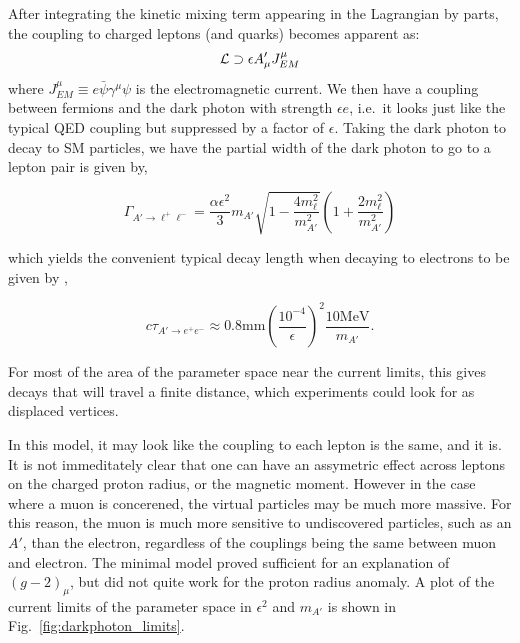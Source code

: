 After integrating the kinetic mixing term appearing in the Lagrangian by parts, the coupling to charged leptons (and quarks) becomes apparent as:
\begin{equation}
    \label{eqn:darkphoton_qed_current}
    \operatorname{\mathcal{L}} \supset \epsilon A'_\mu J^\mu_{EM}
\end{equation}
where $J^\mu_{EM} \equiv e \bar{\psi} \gamma^\mu \psi$ is the electromagnetic current.
We then have a coupling between fermions and the dark photon with strength $\epsilon e$, i.e.\ it looks just like the typical QED coupling but suppressed by a factor of $\epsilon$.
Taking the dark photon to decay to SM particles, we have the partial width of the dark photon to go to a lepton pair is given by,

\begin{equation}
    \Gamma_{A' \rightarrow \ell^+ \ell^-} = \frac{\alpha \epsilon^2}{3} m_{A'} \sqrt{1-\frac{4 m_\ell^2}{m_{A'}^2}}\left(1 + \frac{2 m_\ell^2}{m_{A'}^2}\right)
\end{equation}

\noindent which yields the convenient typical decay length when decaying to electrons to be given by \cite{Echenard:2014lma},

\begin{equation}
    c \tau_{A' \rightarrow e^+ e^-} \approx 0.8\textrm{mm} \left(\frac{10^{-4}}{\epsilon}\right)^2 \frac{10\textrm{MeV}}{m_{A'}}\textrm{.}
\end{equation}

\noindent For most of the area of the parameter space near the current limits, this gives decays that will travel a finite distance, which experiments could look for as displaced vertices.

In this model, it may look like the coupling to each lepton is the same, and it is.
It is not immeditately clear that one can have an assymetric effect across leptons on the charged proton radius, or the magnetic moment.
However in the case where a muon is concerened, the virtual particles may be much more massive.
For this reason, the muon is much more sensitive to undiscovered particles, such as an $A'$, than the electron, regardless of the couplings being the same between muon and electron.
The minimal model proved sufficient for an explanation of $(g-2)_\mu$, but did not quite work for the proton radius anomaly.
A plot of the current limits of the parameter space in $\epsilon^2$ and $m_{A'}$ is shown in Fig.\ \ref{fig:darkphoton_limits}.

